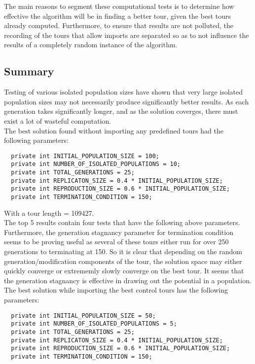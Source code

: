 \documentclass[12pt]{article}
\begin{document}
The main reasons to segment these computational tests is to determine how effective the algorithm will be in finding a better tour, given the best tours already computed. Furthermore, to ensure that results are not polluted, the recording of the tours that allow imports are separated so as to not influence the results of a completely random instance of the algorithm.

\subsection{Summary}

Testing of various isolated population sizes have shown that very large isolated population sizes may not necessarily produce significantly better results. As each generation takes significantly longer, and as the solution coverges, there must exist a lot of wasteful computation.\\

The best solution found without importing any predefined tours had the following parameters:
\begin{verbatim}
  private int INITIAL_POPULATION_SIZE = 100;
  private int NUMBER_OF_ISOLATED_POPULATIONS = 10;
  private int TOTAL_GENERATIONS = 25;
  private int REPLICATON_SIZE = 0.4 * INITIAL_POPULATION_SIZE;
  private int REPRODUCTION_SIZE = 0.6 * INITIAL_POPULATION_SIZE;
  private int TERMINATION_CONDITION = 150;
\end{verbatim}
With a tour length = 109427.\\

The top 5 results contain four tests that have the following above parameters. Furthermore, the generation stagnancy parameter for termination condition seems to be proving useful as several of these tours either run for over 250 generations to terminating at 150. So it is clear that depending on the random generation/modification components of the tour, the solution space may either quickly converge or extrememly slowly converge on the best tour. It seems that the generation stagnancy is effective in drawing out the potential in a population.\\

The best solution while importing the best control tours has the following parameters:
\begin{verbatim}
  private int INITIAL_POPULATION_SIZE = 50;
  private int NUMBER_OF_ISOLATED_POPULATIONS = 5;
  private int TOTAL_GENERATIONS = 25;
  private int REPLICATON_SIZE = 0.4 * INITIAL_POPULATION_SIZE;
  private int REPRODUCTION_SIZE = 0.6 * INITIAL_POPULATION_SIZE;
  private int TERMINATION_CONDITION = 150;
\end{verbatim}
\end{document}
